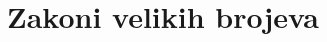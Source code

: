 \documentclass[a4paper,twoside,12pt]{report}
\begin{document}
    


    


    


    \part{Zakoni velikih brojeva}



    


    


    
    
\end{document}
